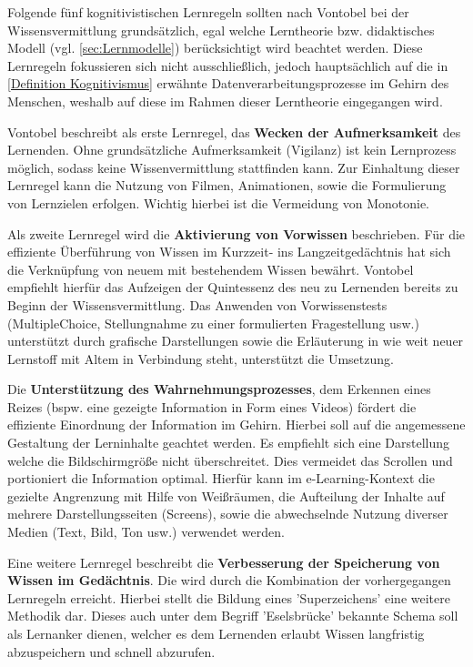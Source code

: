 Folgende fünf kognitivistischen Lernregeln sollten nach Vontobel bei der Wissensvermittlung grundsätzlich, egal welche Lerntheorie bzw. didaktisches Modell (vgl. \ref{sec:Lernmodelle}) berücksichtigt wird beachtet werden. Diese Lernregeln fokussieren sich nicht ausschließlich, jedoch hauptsächlich auf die in \ref{Definition Kognitivismus} erwähnte Datenverarbeitungsprozesse im Gehirn des Menschen, weshalb auf diese im Rahmen dieser Lerntheorie eingegangen wird.\cite[S. 10]{Vontobel.2006}

Vontobel beschreibt als erste Lernregel, das \textbf{Wecken der Aufmerksamkeit} des Lernenden. Ohne grundsätzliche Aufmerksamkeit (Vigilanz) ist kein Lernprozess möglich, sodass keine Wissenvermittlung stattfinden kann. Zur Einhaltung dieser Lernregel kann die Nutzung von Filmen, Animationen, sowie die Formulierung von Lernzielen erfolgen. Wichtig hierbei ist die Vermeidung von Monotonie. \cite[S. 10f.]{Vontobel.2006}

Als zweite Lernregel wird die \textbf{Aktivierung von Vorwissen} beschrieben. Für die effiziente Überführung von Wissen im Kurzzeit- ins Langzeitgedächtnis hat sich die Verknüpfung von neuem mit bestehendem Wissen bewährt. Vontobel empfiehlt hierfür das Aufzeigen der Quintessenz des neu zu Lernenden bereits zu Beginn der Wissensvermittlung. Das Anwenden von Vorwissenstests (MultipleChoice, Stellungnahme zu einer formulierten Fragestellung usw.) unterstützt durch grafische Darstellungen sowie die Erläuterung in wie weit neuer Lernstoff mit Altem in Verbindung steht, unterstützt die Umsetzung. \cite[S. 11f.]{Vontobel.2006}

Die \textbf{Unterstützung des Wahrnehmungsprozesses}, dem Erkennen eines Reizes (bspw. eine gezeigte Information in Form eines Videos) fördert die effiziente Einordnung der Information im Gehirn. Hierbei soll auf die angemessene Gestaltung der Lerninhalte geachtet werden. Es empfiehlt sich eine Darstellung welche die Bildschirmgröße nicht überschreitet. Dies vermeidet das Scrollen und portioniert die Information optimal. Hierfür kann im e-Learning-Kontext die gezielte Angrenzung mit Hilfe von Weißräumen, die Aufteilung der Inhalte auf mehrere Darstellungsseiten (Screens), sowie die abwechselnde Nutzung diverser Medien (Text, Bild, Ton usw.) verwendet werden.\cite[S. 12f.]{Vontobel.2006}

Eine weitere Lernregel beschreibt die \textbf{Verbesserung der Speicherung von Wissen im Gedächtnis}. Die wird durch die Kombination der vorhergegangen Lernregeln erreicht. Hierbei stellt die Bildung eines 'Superzeichens' eine weitere Methodik dar. Dieses auch unter dem Begriff 'Eselsbrücke' bekannte Schema soll als Lernanker dienen, welcher es dem Lernenden erlaubt Wissen langfristig abzuspeichern und schnell abzurufen. \cite[S.14]{Vontobel.2006}   
        
